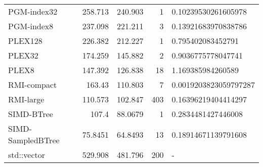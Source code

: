 \begin{tabular}{lrrrl}
 PGM-index32       &               258.713  &              240.903  &            1 & 0.10239530261605978   \\
 PGM-index8        &               237.098  &              221.211  &            3 & 0.13921683970838786   \\
 PLEX128           &               226.382  &              212.227  &            1 & 0.795402083452791     \\
 PLEX32            &               174.259  &              145.882  &            2 & 0.9036775778047741    \\
 PLEX8             &               147.392  &              126.838  &           18 & 1.169385984260589     \\
 RMI-compact       &               163.43   &              110.803  &            7 & 0.0019203823059797287 \\
 RMI-large         &               110.573  &              102.847  &          403 & 0.16396219404414297   \\
 SIMD-BTree        &               107.4    &               88.0679 &            1 & 0.2834481427446008    \\
 SIMD-SampledBTree &                75.8451 &               64.8493 &           13 & 0.18914671139791608   \\
 std::vector       &               529.908  &              481.796  &          200 & -                     \\
\hline
\end{tabular}